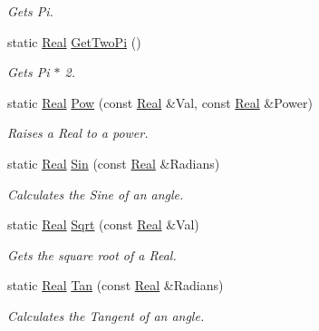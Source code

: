 \begin{DoxyCompactItemize}
\begin{DoxyCompactList}\small\item\em Gets Pi. \item\end{DoxyCompactList}\item 
static \hyperlink{namespaceMezzanine_a726731b1a7df72bf3583e4a97282c6f6}{Real} \hyperlink{classMezzanine_1_1MathTool_afd4da5be9f2f1f89dfa92235a5b02307}{GetTwoPi} ()
\begin{DoxyCompactList}\small\item\em Gets Pi $\ast$ 2. \item\end{DoxyCompactList}\item 
static \hyperlink{namespaceMezzanine_a726731b1a7df72bf3583e4a97282c6f6}{Real} \hyperlink{classMezzanine_1_1MathTool_ad38737da349c0aea453d42f79e5c61d1}{Pow} (const \hyperlink{namespaceMezzanine_a726731b1a7df72bf3583e4a97282c6f6}{Real} \&Val, const \hyperlink{namespaceMezzanine_a726731b1a7df72bf3583e4a97282c6f6}{Real} \&Power)
\begin{DoxyCompactList}\small\item\em Raises a Real to a power. \item\end{DoxyCompactList}\item 
static \hyperlink{namespaceMezzanine_a726731b1a7df72bf3583e4a97282c6f6}{Real} \hyperlink{classMezzanine_1_1MathTool_a58b35317198c5d4cdf1680e5516747c3}{Sin} (const \hyperlink{namespaceMezzanine_a726731b1a7df72bf3583e4a97282c6f6}{Real} \&Radians)
\begin{DoxyCompactList}\small\item\em Calculates the Sine of an angle. \item\end{DoxyCompactList}\item 
static \hyperlink{namespaceMezzanine_a726731b1a7df72bf3583e4a97282c6f6}{Real} \hyperlink{classMezzanine_1_1MathTool_af230371a8d6f59b4ee78670afd3928fa}{Sqrt} (const \hyperlink{namespaceMezzanine_a726731b1a7df72bf3583e4a97282c6f6}{Real} \&Val)
\begin{DoxyCompactList}\small\item\em Gets the square root of a Real. \item\end{DoxyCompactList}\item 
static \hyperlink{namespaceMezzanine_a726731b1a7df72bf3583e4a97282c6f6}{Real} \hyperlink{classMezzanine_1_1MathTool_a4fd17164ea990aff0203c63946bb1d48}{Tan} (const \hyperlink{namespaceMezzanine_a726731b1a7df72bf3583e4a97282c6f6}{Real} \&Radians)
\begin{DoxyCompactList}\small\item\em Calculates the Tangent of an angle. \item\end{DoxyCompactList}\end{DoxyCompactItemize}
